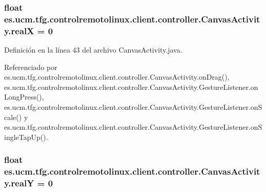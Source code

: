\hypertarget{classes_1_1ucm_1_1tfg_1_1controlremotolinux_1_1client_1_1controller_1_1CanvasActivity_a3946282d86de3f4ef1ef65c54b2669bc}{
\subsubsection[{real\-X}]{\setlength{\rightskip}{0pt plus 5cm}float es.\-ucm.\-tfg.\-controlremotolinux.\-client.\-controller.\-Canvas\-Activity.\-real\-X = 0\hspace{0.3cm}{\ttfamily [private]}}}\label{classes_1_1ucm_1_1tfg_1_1controlremotolinux_1_1client_1_1controller_1_1CanvasActivity_a3946282d86de3f4ef1ef65c54b2669bc}


Definición en la línea 43 del archivo Canvas\-Activity.\-java.



Referenciado por es.\-ucm.\-tfg.\-controlremotolinux.\-client.\-controller.\-Canvas\-Activity.\-on\-Drag(), es.\-ucm.\-tfg.\-controlremotolinux.\-client.\-controller.\-Canvas\-Activity.\-Gesture\-Listener.\-on\-Long\-Press(), es.\-ucm.\-tfg.\-controlremotolinux.\-client.\-controller.\-Canvas\-Activity.\-Gesture\-Listener.\-on\-Scale() y es.\-ucm.\-tfg.\-controlremotolinux.\-client.\-controller.\-Canvas\-Activity.\-Gesture\-Listener.\-on\-Single\-Tap\-Up().

\hypertarget{classes_1_1ucm_1_1tfg_1_1controlremotolinux_1_1client_1_1controller_1_1CanvasActivity_ad8b534f3e3c61b4ff0576ac5a16f7d44}{
\subsubsection[{real\-Y}]{\setlength{\rightskip}{0pt plus 5cm}float es.\-ucm.\-tfg.\-controlremotolinux.\-client.\-controller.\-Canvas\-Activity.\-real\-Y = 0\hspace{0.3cm}{\ttfamily [private]}}}\label{classes_1_1ucm_1_1tfg_1_1controlremotolinux_1_1client_1_1controller_1_1CanvasActivity_ad8b534f3e3c61b4ff0576ac5a16f7d44}


